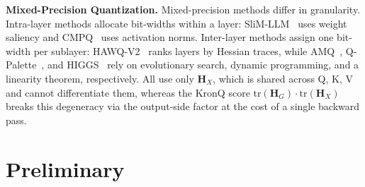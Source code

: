 \documentclass{article} %
\begin{document}

\textbf{Mixed-Precision Quantization.} Mixed-precision methods differ in granularity. Intra-layer methods allocate bit-widths within a layer: SliM-LLM~\citep{huang2024slim} uses weight saliency and CMPQ~\citep{chen2024channel} uses activation norms. Inter-layer methods assign one bit-width per sublayer: HAWQ-V2~\citep{dong2020hawq} ranks layers by Hessian traces, while AMQ~\citep{lee2025amq}, Q-Palette~\citep{lee2026q}, and HIGGS~\citep{malinovskii2025higgs} rely on evolutionary search, dynamic programming, and a linearity theorem, respectively. All use only $\mathbf{H}_X$, which is shared across Q, K, V and cannot differentiate them, whereas the KronQ score $\mathrm{tr}(\mathbf{H}_G)\cdot\mathrm{tr}(\mathbf{H}_X)$ breaks this degeneracy via the output-side factor at the cost of a single backward pass.

\vspace{-3mm}
\section{Preliminary}
\label{sec:background}
\vspace{-3mm}
\end{document}
